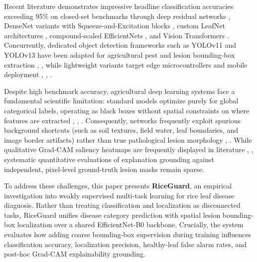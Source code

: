 \documentclass[conference]{IEEEtran}
\begin{document}
Recent literature demonstrates impressive headline classification accuracies exceeding 95\% on closed-set benchmarks through deep residual networks \cite{ref19}, DenseNet variants with Squeeze-and-Excitation blocks \cite{ref2}, custom LeafNet architectures \cite{ref17}, compound-scaled EfficientNets \cite{ref15}, and Vision Transformers \cite{ref6}. Concurrently, dedicated object detection frameworks such as YOLOv11 and YOLOv13 have been adapted for agricultural pest and lesion bounding-box extraction \cite{ref1}, \cite{ref12}, while lightweight variants target edge microcontrollers and mobile deployment \cite{ref3}, \cite{ref9}, \cite{ref14}.

Despite high benchmark accuracy, agricultural deep learning systems face a fundamental scientific limitation: standard models optimize purely for global categorical labels, operating as black boxes without spatial constraints on where features are extracted \cite{ref4}, \cite{ref5}, \cite{ref7}. Consequently, networks frequently exploit spurious background shortcuts (such as soil textures, field water, leaf boundaries, and image border artifacts) rather than true pathological lesion morphology \cite{ref6}, \cite{ref8}. While qualitative Grad-CAM saliency heatmaps are frequently displayed in literature \cite{ref4}, \cite{ref7}, systematic quantitative evaluations of explanation grounding against independent, pixel-level ground-truth lesion masks remain sparse.

To address these challenges, this paper presents \textbf{RiceGuard}, an empirical investigation into weakly supervised multi-task learning for rice leaf disease diagnosis. Rather than treating classification and localization as disconnected tasks, RiceGuard unifies disease category prediction with spatial lesion bounding-box localization over a shared EfficientNet-B0 backbone. Crucially, the system evaluates how adding coarse bounding-box supervision during training influences classification accuracy, localization precision, healthy-leaf false alarm rates, and post-hoc Grad-CAM explainability grounding.
\end{document}
